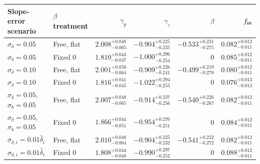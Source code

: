 \begin{tabular}{llrrrr}
\toprule
Slope-error scenario & $\beta$ treatment & $\gamma_p$ & $\gamma_z$ & $\beta$ & $f_{\rm int}$ \\
\midrule
$\sigma_\delta=0.05$ & Free, flat & $2.008_{-0.065}^{+0.048}$ & $-0.904_{-0.235}^{+0.225}$ & $-0.533_{-0.275}^{+0.231}$ & $0.082_{-0.011}^{+0.012}$ \\
$\sigma_\delta=0.05$ & Fixed 0 & $1.810_{-0.047}^{+0.043}$ & $-1.000_{-0.254}^{+0.296}$ & $0$ & $0.085_{-0.011}^{+0.012}$ \\
$\sigma_\delta=0.10$ & Free, flat & $2.001_{-0.064}^{+0.050}$ & $-0.909_{-0.241}^{+0.226}$ & $-0.499_{-0.278}^{+0.219}$ & $0.080_{-0.011}^{+0.012}$ \\
$\sigma_\delta=0.10$ & Fixed 0 & $1.816_{-0.045}^{+0.041}$ & $-1.022_{-0.255}^{+0.294}$ & $0$ & $0.076_{-0.013}^{+0.013}$ \\
$\sigma_\delta=0.05$, $\sigma_b=0.05$ & Free, flat & $2.007_{-0.065}^{+0.048}$ & $-0.914_{-0.256}^{+0.237}$ & $-0.540_{-0.267}^{+0.226}$ & $0.082_{-0.011}^{+0.012}$ \\
$\sigma_\delta=0.05$, $\sigma_b=0.05$ & Fixed 0 & $1.866_{-0.051}^{+0.044}$ & $-0.954_{-0.251}^{+0.270}$ & $0$ & $0.084_{-0.011}^{+0.012}$ \\
$\sigma_{\delta,i}=0.01\widehat\delta_i$ & Free, flat & $2.010_{-0.064}^{+0.048}$ & $-0.904_{-0.232}^{+0.225}$ & $-0.541_{-0.272}^{+0.232}$ & $0.082_{-0.011}^{+0.012}$ \\
$\sigma_{\delta,i}=0.01\widehat\delta_i$ & Fixed 0 & $1.808_{-0.048}^{+0.044}$ & $-0.990_{-0.252}^{+0.297}$ & $0$ & $0.088_{-0.011}^{+0.012}$ \\
\bottomrule
\end{tabular}
